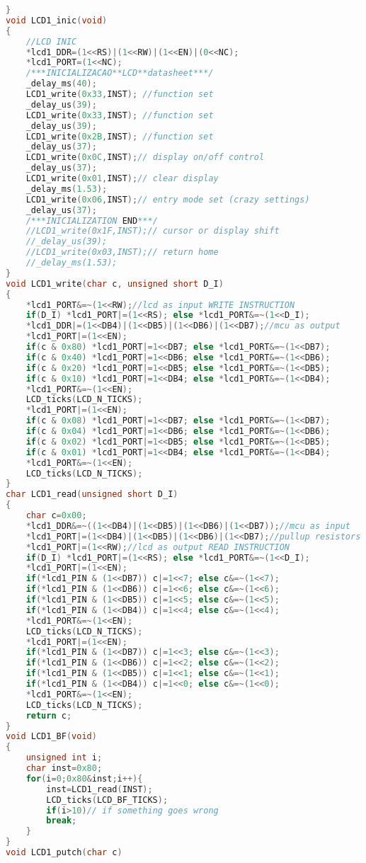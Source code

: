 \begin{lstlisting}[language=C, caption={lcd.c}, label=lcd-c, captionpos=b]
}
void LCD1_inic(void)
{
	//LCD INIC
	*lcd1_DDR=(1<<RS)|(1<<RW)|(1<<EN)|(0<<NC);
	*lcd1_PORT=(1<<NC);
	/***INICIALIZACAO**LCD**datasheet***/
	_delay_ms(40);
	LCD1_write(0x33,INST); //function set
	_delay_us(39);
	LCD1_write(0x33,INST); //function set
	_delay_us(39);
	LCD1_write(0x2B,INST); //function set
	_delay_us(37);
	LCD1_write(0x0C,INST);// display on/off control
	_delay_us(37);
	LCD1_write(0x01,INST);// clear display
	_delay_ms(1.53);
	LCD1_write(0x06,INST);// entry mode set (crazy settings)
	_delay_us(37);
	/***INICIALIZATION END***/
	//LCD1_write(0x1F,INST);// cursor or display shift
	//_delay_us(39);
	//LCD1_write(0x03,INST);// return home
	//_delay_ms(1.53);
}
void LCD1_write(char c, unsigned short D_I)
{
	*lcd1_PORT&=~(1<<RW);//lcd as input WRITE INSTRUCTION
	if(D_I) *lcd1_PORT|=(1<<RS); else *lcd1_PORT&=~(1<<D_I);
	*lcd1_DDR|=(1<<DB4)|(1<<DB5)|(1<<DB6)|(1<<DB7);//mcu as output
	*lcd1_PORT|=(1<<EN);
	if(c & 0x80) *lcd1_PORT|=1<<DB7; else *lcd1_PORT&=~(1<<DB7);
	if(c & 0x40) *lcd1_PORT|=1<<DB6; else *lcd1_PORT&=~(1<<DB6);
	if(c & 0x20) *lcd1_PORT|=1<<DB5; else *lcd1_PORT&=~(1<<DB5);
	if(c & 0x10) *lcd1_PORT|=1<<DB4; else *lcd1_PORT&=~(1<<DB4);
	*lcd1_PORT&=~(1<<EN);
	LCD_ticks(LCD_N_TICKS);
	*lcd1_PORT|=(1<<EN);
	if(c & 0x08) *lcd1_PORT|=1<<DB7; else *lcd1_PORT&=~(1<<DB7);
	if(c & 0x04) *lcd1_PORT|=1<<DB6; else *lcd1_PORT&=~(1<<DB6);
	if(c & 0x02) *lcd1_PORT|=1<<DB5; else *lcd1_PORT&=~(1<<DB5);
	if(c & 0x01) *lcd1_PORT|=1<<DB4; else *lcd1_PORT&=~(1<<DB4);
	*lcd1_PORT&=~(1<<EN);
	LCD_ticks(LCD_N_TICKS);
}
char LCD1_read(unsigned short D_I)
{
	char c=0x00;
	*lcd1_DDR&=~((1<<DB4)|(1<<DB5)|(1<<DB6)|(1<<DB7));//mcu as input
	*lcd1_PORT|=(1<<DB4)|(1<<DB5)|(1<<DB6)|(1<<DB7);//pullup resistors
	*lcd1_PORT|=(1<<RW);//lcd as output READ INSTRUCTION
	if(D_I) *lcd1_PORT|=(1<<RS); else *lcd1_PORT&=~(1<<D_I);
	*lcd1_PORT|=(1<<EN);
	if(*lcd1_PIN & (1<<DB7)) c|=1<<7; else c&=~(1<<7);
	if(*lcd1_PIN & (1<<DB6)) c|=1<<6; else c&=~(1<<6);
	if(*lcd1_PIN & (1<<DB5)) c|=1<<5; else c&=~(1<<5);
	if(*lcd1_PIN & (1<<DB4)) c|=1<<4; else c&=~(1<<4);
	*lcd1_PORT&=~(1<<EN);
	LCD_ticks(LCD_N_TICKS);
	*lcd1_PORT|=(1<<EN);
	if(*lcd1_PIN & (1<<DB7)) c|=1<<3; else c&=~(1<<3);
	if(*lcd1_PIN & (1<<DB6)) c|=1<<2; else c&=~(1<<2);
	if(*lcd1_PIN & (1<<DB5)) c|=1<<1; else c&=~(1<<1);
	if(*lcd1_PIN & (1<<DB4)) c|=1<<0; else c&=~(1<<0);
	*lcd1_PORT&=~(1<<EN);
	LCD_ticks(LCD_N_TICKS);
	return c;
}
void LCD1_BF(void)
{
	unsigned int i;
	char inst=0x80;
	for(i=0;0x80&inst;i++){
		inst=LCD1_read(INST);
		LCD_ticks(LCD_BF_TICKS);
		if(i>10)// if something goes wrong
		break;
	}
}
void LCD1_putch(char c)

\end{lstlisting}
